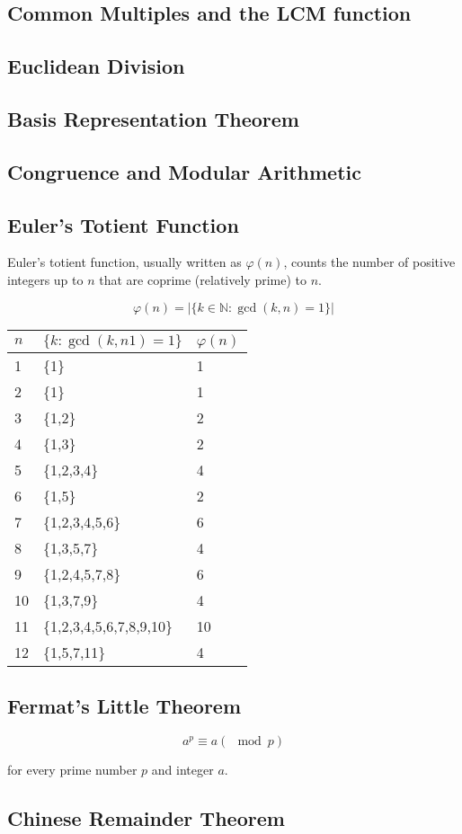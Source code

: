 \documentclass[11pt]{article}
\theoremstyle{plain}
\theoremstyle{definition}
\begin{document}
\subsection*{Common Multiples and the LCM function}

\subsection*{Euclidean Division}

\subsection*{Basis Representation Theorem}

\subsection*{Congruence and Modular Arithmetic}

\subsection*{Euler's Totient Function}

Euler's totient function, usually written as $\varphi(n)$, counts the number of positive integers up to $n$ that are coprime (relatively prime) to $n$.

$$ \varphi(n) = |\{k \in \mathbb{N} : \gcd(k, n) = 1\}| $$

\begin{center}
  \begin{tabular}{l l l}
    $n$ & $\{k : \gcd(k, n1) = 1\}$ & $\varphi(n)$ \\
    \hline
    1  & \{1\}                    & 1 \\
    2  & \{1\}                    & 1 \\
    3  & \{1,2\}                  & 2 \\
    4  & \{1,3\}                  & 2 \\
    5  & \{1,2,3,4\}              & 4 \\
    6  & \{1,5\}                  & 2 \\
    7  & \{1,2,3,4,5,6\}          & 6 \\
    8  & \{1,3,5,7\}              & 4 \\
    9  & \{1,2,4,5,7,8\}          & 6 \\
    10 & \{1,3,7,9\}              & 4 \\
    11 & \{1,2,3,4,5,6,7,8,9,10\} & 10 \\
    12 & \{1,5,7,11\}             & 4 \\
  \end{tabular}
\end{center}

\subsection*{Fermat's Little Theorem}

$$
a^p \equiv a (\mod p)
$$

for every prime number $p$ and integer $a$.

\subsection*{Chinese Remainder Theorem}
\end{document}

